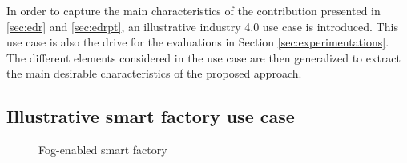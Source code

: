 \documentclass{iosart2c}
\begin{document}
In order to capture the main characteristics of the contribution presented in \textsection \ref{sec:edr} and \textsection \ref{sec:edrpt}, an illustrative industry 4.0 use case is introduced. 
This use case is also the drive for the evaluations in Section \textsection \ref{sec:experimentations}.
The different elements considered in the use case are then generalized to extract the main desirable characteristics of the proposed approach.

\subsection{Illustrative smart factory use case}
\label{sec:distribution_use_case}

\begin{figure}
	\centering
	\caption{Fog-enabled smart factory}
	\label{fig:usecase}
\end{figure}
\end{document}
